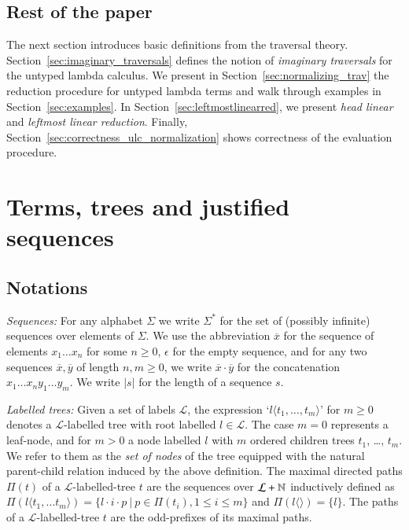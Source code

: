 \documentclass{elsarticle}
\theoremstyle{plain}
\theoremstyle{definition}
\begin{document}
\subsection{Rest of the paper}

The next section introduces basic definitions from the traversal theory. Section~\ref{sec:imaginary_traversals} defines the notion of \emph{imaginary traversals} for the untyped lambda calculus. We present in Section~\ref{sec:normalizing_trav} the reduction procedure for untyped lambda terms and walk through examples in Section~\ref{sec:examples}. In Section~\ref{sec:leftmostlinearred}, we present \emph{head linear} and \emph{leftmost linear reduction}. Finally, Section~\ref{sec:correctness_ulc_normalization} shows correctness of the evaluation procedure.


\section{Terms, trees and justified sequences}
\label{sec:basic_def}
\subsection{Notations}
\emph{Sequences:} For any alphabet $\Sigma$ we write $\Sigma^*$ for the
set of (possibly infinite) sequences over elements of $\Sigma$.
 We use the abbreviation $\overline{x}$ for the sequence of elements $x_1 \ldots x_n$ for some $n\geq0$, $\epsilon$ for the empty sequence, and for any two sequences $\overline{x}, \overline{y}$ of length $n,m\geq 0$, we write $\overline{x} \cdot \overline{y}$ for the concatenation $x_1 \ldots x_n y_1 \ldots y_m$. We write $|s|$ for the length of a sequence $s$.

 \emph{Labelled trees:} Given a set of labels $\mathcal{L}$, the expression `$l\langle t_1, \ldots, t_m \rangle$' for $m \geq 0$ denotes a $\mathcal{L}$-labelled tree with root labelled $l\in \mathcal{L}$. The case $m=0$ represents a leaf-node, and for $m>0$ a node labelled $l$ with $m$ ordered children trees $t_1$, \ldots, $t_m$.
 We refer to them as the \emph{set of nodes} of the tree equipped with
 the natural parent-child relation induced by the above definition.
 The maximal directed paths $\Pi(t)$ of a $\mathcal{L}$-labelled-tree $t$ are the sequences over $\mathcal{L} + \mathbb{N}$
 inductively defined as
 $\Pi(l \langle t_1, \ldots t_m \rangle) = \{ l \cdot i \cdot p \ |  \ p \in \Pi(t_i), 1\leq i \leq m \}$ and
 $\Pi(l\langle \rangle) = \{ l \}$.
 The paths of a $\mathcal{L}$-labelled-tree $t$ are the odd-prefixes of its maximal paths.
\end{document}
